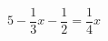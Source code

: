 \begin{ex}
	\begin{condition}
		\( 5-\dfrac{1}{3}x-\dfrac{1}{2}=\dfrac{1}{4}x \)
	\end{condition}
\end{ex}